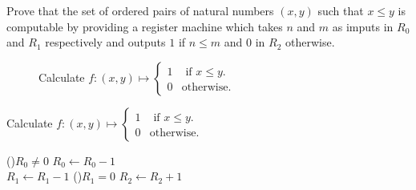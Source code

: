 \begin{problem}
  Prove that the set of ordered pairs of natural numbers $(x, y)$
  such that $x \leq y$ is computable by providing a register machine
  which takes $n$ and $m$ as imputs in $R_0$ and $R_1$ respectively
  and outputs $1$ if $n \leq m$ and $0$ in $R_2$ otherwise.

  \begin{answer}

    \begin{figure}[H]
      \centering
      \caption{Calculate $\displaystyle f: (x, y) \mapsto \begin{cases}
        1 &\text{ if } x \leq y.\\
        0 &\text{otherwise.}
      \end{cases}$}
      \label{fig:leq}
    \end{figure}

    \begin{algorithm}[H]
      \caption{Calculate $\displaystyle f: (x, y) \mapsto \begin{cases}
        1 &\text{ if } x \leq y.\\
        0 &\text{otherwise.}
      \end{cases}$}
        \While(){$R_0 \neq 0$}{
          $R_0 \gets R_0 - 1$ \\
          $R_1 \gets R_1 - 1$
        }
        \If(){$R_1 = 0$}{
          $R_2 \gets R_2 + 1$
        }
    \end{algorithm}
  \end{answer}
\end{problem}
